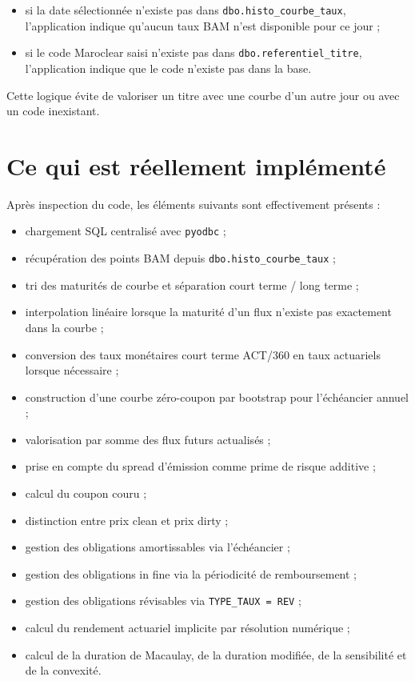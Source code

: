 \documentclass[12pt,a4paper]{article}
\begin{document}
\begin{itemize}
    \item si la date sélectionnée n'existe pas dans \texttt{dbo.histo\_courbe\_taux}, l'application indique qu'aucun taux BAM n'est disponible pour ce jour ;
    \item si le code Maroclear saisi n'existe pas dans \texttt{dbo.referentiel\_titre}, l'application indique que le code n'existe pas dans la base.
\end{itemize}

Cette logique évite de valoriser un titre avec une courbe d'un autre jour ou avec un code inexistant.

\section{Ce qui est réellement implémenté}

Après inspection du code, les éléments suivants sont effectivement présents :

\begin{itemize}
    \item chargement SQL centralisé avec \texttt{pyodbc} ;
    \item récupération des points BAM depuis \texttt{dbo.histo\_courbe\_taux} ;
    \item tri des maturités de courbe et séparation court terme / long terme ;
    \item interpolation linéaire lorsque la maturité d'un flux n'existe pas exactement dans la courbe ;
    \item conversion des taux monétaires court terme ACT/360 en taux actuariels lorsque nécessaire ;
    \item construction d'une courbe zéro-coupon par bootstrap pour l'échéancier annuel ;
    \item valorisation par somme des flux futurs actualisés ;
    \item prise en compte du spread d'émission comme prime de risque additive ;
    \item calcul du coupon couru ;
    \item distinction entre prix clean et prix dirty ;
    \item gestion des obligations amortissables via l'échéancier ;
    \item gestion des obligations in fine via la périodicité de remboursement ;
    \item gestion des obligations révisables via \texttt{TYPE\_TAUX = REV} ;
    \item calcul du rendement actuariel implicite par résolution numérique ;
    \item calcul de la duration de Macaulay, de la duration modifiée, de la sensibilité et de la convexité.
\end{itemize}
\end{document}
